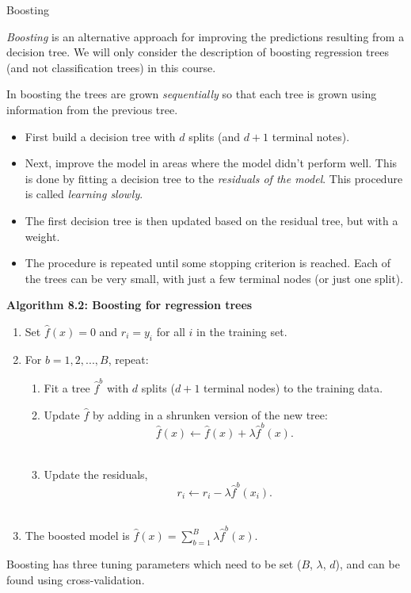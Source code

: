 \documentclass[10pt,ignorenonframetext,]{beamer}
\providecommand{\tightlist}{%
  \setlength{\itemsep}{0pt}\setlength{\parskip}{0pt}}
\begin{document}
\begin{frame}{Boosting}

\emph{Boosting} is an alternative approach for improving the predictions
resulting from a decision tree. We will only consider the description of
boosting regression trees (and not classification trees) in this course.

In boosting the trees are grown \emph{sequentially} so that each tree is
grown using information from the previous tree.

\begin{itemize}
\tightlist
\item
  First build a decision tree with \(d\) splits (and \(d+1\) terminal
  notes).
\item
  Next, improve the model in areas where the model didn't perform well.
  This is done by fitting a decision tree to the \emph{residuals of the
  model}. This procedure is called \emph{learning slowly}.
\item
  The first decision tree is then updated based on the residual tree,
  but with a weight.
\item
  The procedure is repeated until some stopping criterion is reached.
  Each of the trees can be very small, with just a few terminal nodes
  (or just one split).
\end{itemize}

\end{frame}

\begin{frame}

\textbf{Algorithm 8.2: Boosting for regression trees}

\begin{enumerate}
\def\labelenumi{\arabic{enumi}.}
\tightlist
\item
  Set \(\hat{f}(x) = 0\) and \(r_i = y_i\) for all \(i\) in the training
  set.
\item
  For \(b=1,2,...,B\), repeat:

  \begin{enumerate}
  \def\labelenumii{\alph{enumii})}
  \tightlist
  \item
    Fit a tree \(\hat{f}^b\) with \(d\) splits (\(d+1\) terminal nodes)
    to the training data.\\
  \item
    Update \(\hat{f}\) by adding in a shrunken version of the new tree:
    \[\hat{f}(x) \leftarrow \hat{f}(x)+\lambda \hat{f}^b(x).\]\\
  \item
    Update the residuals,
    \[r_i \leftarrow r_i - \lambda \hat{f}^b(x_i).\]\\
  \end{enumerate}
\item
  The boosted model is
  \(\hat{f}(x) = \sum_{b=1}^B \lambda \hat{f}^b(x).\)
\end{enumerate}

Boosting has three tuning parameters which need to be set (\(B\),
\(\lambda\), \(d\)), and can be found using cross-validation.

\end{frame}
\end{document}
